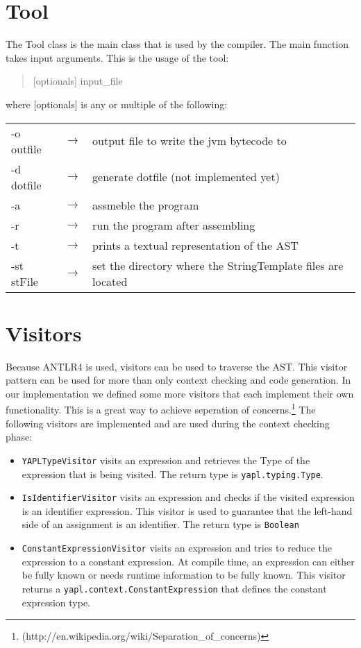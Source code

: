 \section{Tool}
The Tool class is the main class that is used by the compiler. The main function takes input arguments. This is the usage of the tool:
\begin{quote}
[optionals] input_file
\end{quote} 

\noindent
where [optionals] is any or multiple of the following: \\
\begin{tabular}{lcl}
-o outfile 	&$\rightarrow$& output file to write the jvm bytecode to \\
-d dotfile	&$\rightarrow$& generate dotfile (not implemented yet) \\
-a 			&$\rightarrow$& assmeble the program \\
-r	 		&$\rightarrow$& run the program after assembling \\
-t			&$\rightarrow$& prints a textual representation of the AST \\
-st stFile  &$\rightarrow$& set the directory where the StringTemplate files are located
\end{tabular} 

\section{Visitors}
Because ANTLR4 is used, visitors can be used to traverse the AST. This visitor pattern can be used for more than only context checking and code generation. In our implementation we defined some more visitors that each implement their own functionality. This is a great way to achieve seperation of concerns.\footnote{(http://en.wikipedia.org/wiki/Separation_of_concerns)} The following visitors are implemented and are used during the context checking phase:

\begin{itemize}
\item \texttt{YAPLTypeVisitor} visits an expression and retrieves the Type of the expression that is being visited. The return type is \texttt{yapl.typing.Type}.
\item \texttt{IsIdentifierVisitor} visits an expression and checks if the visited expression is an identifier expression. This visitor is used to guarantee that the left-hand side of an assignment is an identifier. The return type is \texttt{Boolean}
\item \texttt{ConstantExpressionVisitor} visits an expression and tries to reduce the expression to a constant expression. At compile time, an expression can either be fully known or needs runtime information to be fully known. This visitor returns a \texttt{yapl.context.ConstantExpression} that defines the constant expression type.
\end{itemize}

